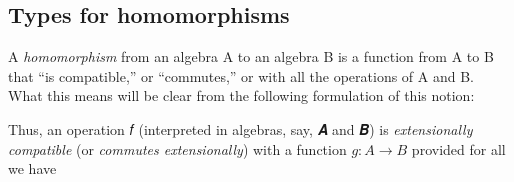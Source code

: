 \documentclass[a4paper,USenglish,cleveref,autoref,thm-restate]{lipics-v2019}
\begin{document}
\subsection{Types for homomorphisms}\label{sec:types-for-homomorphisms}
A \emph{homomorphism} from an algebra \alg A to an algebra \alg B is a function from \m A to \m B that ``is compatible,'' or ``commutes,'' or  with all the operations of \alg A and \alg B. What this means will be clear from the following \agda formulation of this notion:
\begin{code}\end{code}
Thus, an operation 𝑓 (interpreted in algebras, say, 𝑨 and 𝑩) is \emph{extensionally compatible} (or \emph{commutes extensionally}) with a function \(g : A → B\) provided for all
\AgdaSpace{}%
\AgdaSymbol{:}\AgdaSpace{}%
\AgdaSpace{}%
\AgdaSpace{}%
\AgdaSpace{}%
\AgdaSpace{}%
\AgdaSpace{}%
\AgdaSpace{}%
\AgdaSpace{}%
\AgdaSpace{}%
we have 
\end{document}
